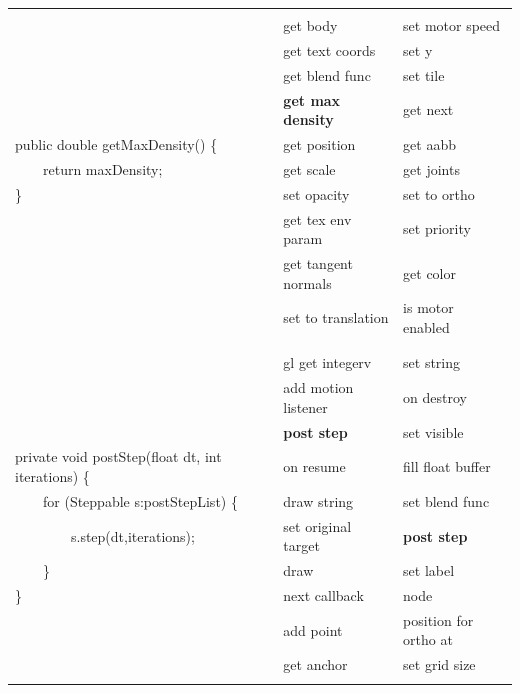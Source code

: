 \begin{table}[!htbp]
\begin{tabular} {|p{10cm}|p{3cm}|p{3cm}|}
    & & \\
    & get body & set motor speed \\
& get text coords & set y \\
& get blend func & set tile \\
& \textbf{get max density}& get next \\
    public double getMaxDensity() \{ & get position & get aabb \\
  \  \ \  \   return maxDensity; & get scale& get joints \\
    \} & set opacity & set to ortho \\
& get tex env param & set priority \\
& get tangent normals & get color \\
& set to translation & is motor enabled \\

    & & \\
    \hline

    & & \\
    & gl get integerv & set string \\
& add motion listener & on destroy \\
& \textbf{post step} & set visible \\
    private void postStep(float dt, int iterations) \{  & on resume & fill float buffer \\
  \  \ \  \   for (Steppable s:postStepList) \{ & draw string & set blend func \\
  \  \ \  \ \  \ \  \   s.step(dt,iterations); & set original target & \textbf{post step}\\
  \  \ \  \   \} & draw & set label \\
    \} & next callback& node \\
& add point & position for ortho at \\
& get anchor & set grid size \\

    & & \\
    \hline
    \end{tabular}
\end{table}

